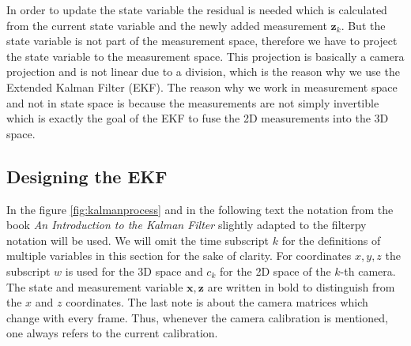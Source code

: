 In order to update the state variable the residual is needed which is calculated from the current state variable and the newly added measurement $\mathbf{z}_k$. But the state variable is not part of the measurement space, therefore we have to project the state variable to the measurement space. This projection is basically a camera projection and is not linear due to a division, which is the reason why we use the Extended Kalman Filter (EKF). The reason why we work in measurement space and not in state space is because the measurements are not simply invertible which is exactly the goal of the EKF to fuse the 2D measurements into the 3D space.

\subsection{Designing the EKF} 
In the figure \ref{fig:kalmanprocess} and in the following text the notation from the book \textit{An Introduction to the Kalman Filter} \cite{kalmanbook} slightly adapted to the filterpy \cite{filterpybook} notation will be used. We will omit the time subscript $k$ for the definitions of multiple variables in this section for the sake of clarity. For coordinates $x,y,z$ the subscript $w$ is used for the 3D space and $c_k$ for the 2D space of the $k$-th camera. The state and measurement variable $\mathbf{x}, \mathbf{z}$ are written in bold to distinguish from the $x$ and $z$ coordinates. The last note is about the camera matrices which change with every frame. Thus, whenever the camera calibration is mentioned, one always refers to the current calibration.

